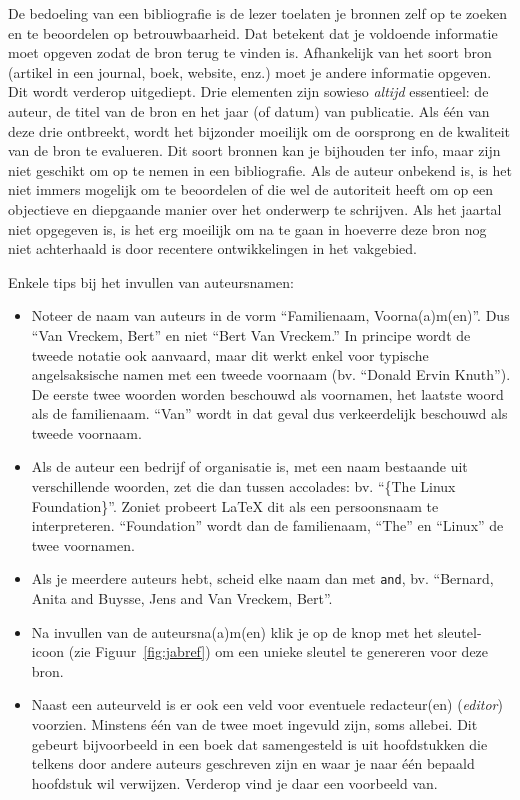 De bedoeling van een bibliografie is de lezer toelaten je bronnen zelf op te zoeken en te beoordelen op betrouwbaarheid. Dat betekent dat je voldoende informatie moet opgeven zodat de bron terug te vinden is. Afhankelijk van het soort bron (artikel in een journal, boek, website, enz.) moet je andere informatie opgeven. Dit wordt verderop uitgediept. Drie elementen zijn sowieso \emph{altijd} essentieel: de auteur, de titel van de bron en het jaar (of datum) van publicatie. Als één van deze drie ontbreekt, wordt het bijzonder moeilijk om de oorsprong en de kwaliteit van de bron te evalueren. Dit soort bronnen kan je bijhouden ter info, maar zijn niet geschikt om op te nemen in een bibliografie. Als de auteur onbekend is, is het niet immers mogelijk om te beoordelen of die wel de autoriteit heeft om op een objectieve en diepgaande manier over het onderwerp te schrijven. Als het jaartal niet opgegeven is, is het erg moeilijk om na te gaan in hoeverre deze bron nog niet achterhaald is door recentere ontwikkelingen in het vakgebied.

Enkele tips bij het invullen van auteursnamen:

\begin{itemize}
  \item Noteer de naam van auteurs in de vorm ``Familienaam, Voorna(a)m(en)''. Dus ``Van Vreckem, Bert'' en niet ``Bert Van Vreckem.'' In principe wordt de tweede notatie ook aanvaard, maar dit werkt enkel voor typische angelsaksische namen met een tweede voornaam (bv. ``Donald Ervin Knuth''). De eerste twee woorden worden beschouwd als voornamen, het laatste woord als de familienaam. ``Van'' wordt in dat geval dus verkeerdelijk beschouwd als tweede voornaam.
  \item Als de auteur een bedrijf of organisatie is, met een naam bestaande uit verschillende woorden, zet die dan tussen accolades: bv. ``\{The Linux Foundation\}''. Zoniet probeert {\LaTeX} dit als een persoonsnaam te interpreteren. ``Foundation'' wordt dan de familienaam, ``The'' en ``Linux'' de twee voornamen.
  \item Als je meerdere auteurs hebt, scheid elke naam dan met \texttt{and}, bv. ``Bernard, Anita and Buysse, Jens and Van Vreckem, Bert''.
  \item Na invullen van de auteursna(a)m(en) klik je op de knop met het sleutel-icoon (zie Figuur~\ref{fig:jabref}) om een unieke sleutel te genereren voor deze bron.
  \item Naast een auteurveld is er ook een veld voor eventuele redacteur(en) (\emph{editor}) voorzien. Minstens één van de twee moet ingevuld zijn, soms allebei. Dit gebeurt bijvoorbeeld in een boek dat samengesteld is uit hoofdstukken die telkens door andere auteurs geschreven zijn en waar je naar één bepaald hoofdstuk wil verwijzen. Verderop vind je daar een voorbeeld van.
\end{itemize}

